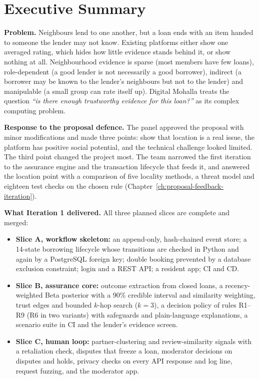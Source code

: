 \chapter*{Executive Summary}

\textbf{Problem.} Neighbours lend to one another, but a loan ends with an item handed to someone the lender may not know. Existing platforms either show one averaged rating, which hides how little evidence stands behind it, or show nothing at all. Neighbourhood evidence is sparse (most members have few loans), role-dependent (a good lender is not necessarily a good borrower), indirect (a borrower may be known to the lender's neighbours but not to the lender) and manipulable (a small group can rate itself up). Digital Mohalla treats the question \textit{``is there enough trustworthy evidence for this loan?''} as its complex computing problem.

\textbf{Response to the proposal defence.} The panel approved the proposal with minor modifications and made three points: show that location is a real issue, the platform has positive social potential, and the technical challenge looked limited. The third point changed the project most. The team narrowed the first iteration to the assurance engine and the transaction lifecycle that feeds it, and answered the location point with a comparison of five locality methods, a threat model and eighteen test checks on the chosen rule (Chapter~\ref{ch:proposal-feedback-iteration}).

\textbf{What Iteration 1 delivered.} All three planned slices are complete and merged:
\begin{itemize}
\item \textbf{Slice A, workflow skeleton:} an append-only, hash-chained event store; a 14-state borrowing lifecycle whose transitions are checked in Python and again by a PostgreSQL foreign key; double booking prevented by a database exclusion constraint; login and a REST API; a resident app; CI and CD.
\item \textbf{Slice B, assurance core:} outcome extraction from closed loans, a recency-weighted Beta posterior with a 90\% credible interval and similarity weighting, trust edges and bounded $k$-hop search ($k=3$), a decision policy of rules R1--R9 (R6 in two variants) with safeguards and plain-language explanations, a scenario suite in CI and the lender's evidence screen.
\item \textbf{Slice C, human loop:} partner-clustering and review-similarity signals with a retaliation check, disputes that freeze a loan, moderator decisions on disputes and holds, privacy checks on every API response and log line, request fuzzing, and the moderator app.
\end{itemize}

